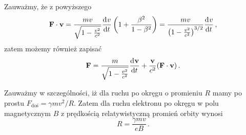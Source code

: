 \documentclass[../main.tex]{subfiles}
\begin{document}
Zauważmy, że z powyższego
\begin{equation*}
    \mathbf{F}\cdot\mathbf{v}=\frac{mv}{\sqrt{1-\frac{v^2}{c^2}}}\dv[]{v}{t}\left(1+\frac{\beta^2}{1-\beta^2}\right)=\frac{mv}{\left(1-\frac{v^2}{c^2}\right)^{3/2}}\dv[]{v}{t}\,,
\end{equation*}
zatem możemy również zapisać
\begin{equation*}
    \mathbf{F}=\frac{m}{\sqrt{1-\frac{v^2}{c^2}}}\dv[]{\mathbf{v}}{t}+\frac{\mathbf{v}}{c^2}(\mathbf{F}\cdot\mathbf{v})\,.
\end{equation*}
\noindent{}
\medskip

Zauważmy w szczególności, iż dla ruchu po okręgu o promieniu \(R\) mamy po prostu \(F_\text{doś}=\gamma mv^2/R\). Zatem dla ruchu elektronu po okręgu w polu magnetycznym \(B\) z prędkością relatywistyczną promień orbity wynosi
\begin{equation*}
    R=\frac{\gamma mv}{eB}\,.
\end{equation*}
\medskip
\end{document}
